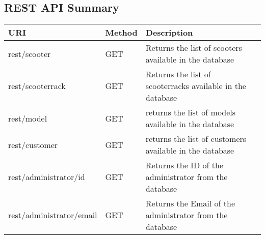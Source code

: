 \subsection{REST API Summary}


\caption{ The list of the rest API for this homweork are still "in progress" because we have to decide according to the frontend where it is better to use a REST call or not. There are some resources we used for rest in the next table.}

\begin{longtable}{|p{}|p{} |p{}|p{}|} 
\hline
\textbf{URI} & \textbf{Method} & \textbf{Description}  \\\hline
rest/scooter & GET &  Returns the list of scooters available in the database \\\hline
rest/scooterrack & GET & Returns the list of scooterracks available in the database \\\hline
rest/model & GET & returns the list of models available in the database \\\hline  
rest/customer & GET & returns the list of customers available in the database \\\hline

rest/administrator/id & GET & Returns the ID of the administrator from the database\\\hline


rest/administrator/email & GET & Returns the Email of the administrator from the database\\\hline




\end{longtable}
